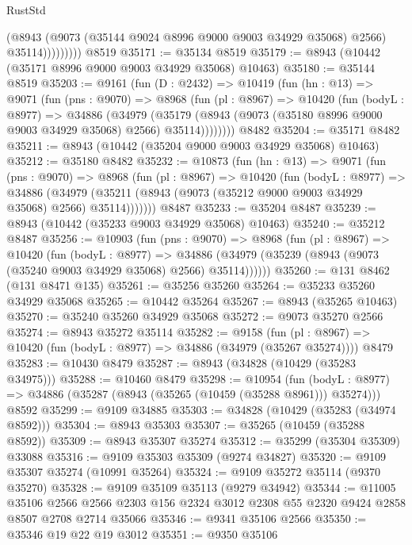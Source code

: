 \begin{lexlean}{RustStd}
\begin{coremodule}
                    (@8943
                      (@9073 (@35144 @9024 @8996 @9000 @9003 @34929 @35068) @2566)
                      @35114)))))))))
    @8519
@35171 := @35134 @8519
@35179 := @8943 (@10442 (@35171 @8996 @9000 @9003 @34929 @35068) @10463)
@35180 := @35144 @8519
@35203 := @9161
    (fun (D : @2432) =>
    @10419
      (fun (hn : @13) =>
      @9071
        (fun (pns : @9070) =>
        @8968
          (fun (pl : @8967) =>
          @10420
            (fun (bodyL : @8977) =>
            @34886
              (@34979
                (@35179 (@8943 (@9073 (@35180 @8996 @9000 @9003 @34929 @35068) @2566) @35114))))))))
    @8482
@35204 := @35171 @8482
@35211 := @8943 (@10442 (@35204 @9000 @9003 @34929 @35068) @10463)
@35212 := @35180 @8482
@35232 := @10873
    (fun (hn : @13) =>
    @9071
      (fun (pns : @9070) =>
      @8968
        (fun (pl : @8967) =>
        @10420
          (fun (bodyL : @8977) =>
          @34886
            (@34979 (@35211 (@8943 (@9073 (@35212 @9000 @9003 @34929 @35068) @2566) @35114)))))))
    @8487
@35233 := @35204 @8487
@35239 := @8943 (@10442 (@35233 @9003 @34929 @35068) @10463)
@35240 := @35212 @8487
@35256 := @10903
    (fun (pns : @9070) =>
    @8968
      (fun (pl : @8967) =>
      @10420
        (fun (bodyL : @8977) =>
        @34886 (@34979 (@35239 (@8943 (@9073 (@35240 @9003 @34929 @35068) @2566) @35114))))))
@35260 := @131 @8462 (@131 @8471 @135)
@35261 := @35256 @35260
@35264 := @35233 @35260 @34929 @35068
@35265 := @10442 @35264
@35267 := @8943 (@35265 @10463)
@35270 := @35240 @35260 @34929 @35068
@35272 := @9073 @35270 @2566
@35274 := @8943 @35272 @35114
@35282 := @9158
    (fun (pl : @8967) => @10420 (fun (bodyL : @8977) => @34886 (@34979 (@35267 @35274))))
    @8479
@35283 := @10430 @8479
@35287 := @8943 (@34828 (@10429 (@35283 @34975)))
@35288 := @10460 @8479
@35298 := @10954
    (fun (bodyL : @8977) => @34886 (@35287 (@8943 (@35265 (@10459 (@35288 @8961))) @35274)))
    @8592
@35299 := @9109 @34885
@35303 := @34828 (@10429 (@35283 (@34974 @8592)))
@35304 := @8943 @35303
@35307 := @35265 (@10459 (@35288 @8592))
@35309 := @8943 @35307 @35274
@35312 := @35299 (@35304 @35309) @33088
@35316 := @9109 @35303 @35309 (@9274 @34827)
@35320 := @9109 @35307 @35274 (@10991 @35264)
@35324 := @9109 @35272 @35114 (@9370 @35270)
@35328 := @9109 @35109 @35113 (@9279 @34942)
@35344 := @11005
    @35106
    @2566
    @2566
    @2303
    @156
    @2324
    @3012
    @2308
    @55
    @2320
    @9424
    @2858
    @8507
    @2708
    @2714
    @35066
@35346 := @9341 @35106 @2566
@35350 := @35346 @19 @22 @19 @3012
@35351 := @9350 @35106

\end{coremodule}
\end{lexlean}
